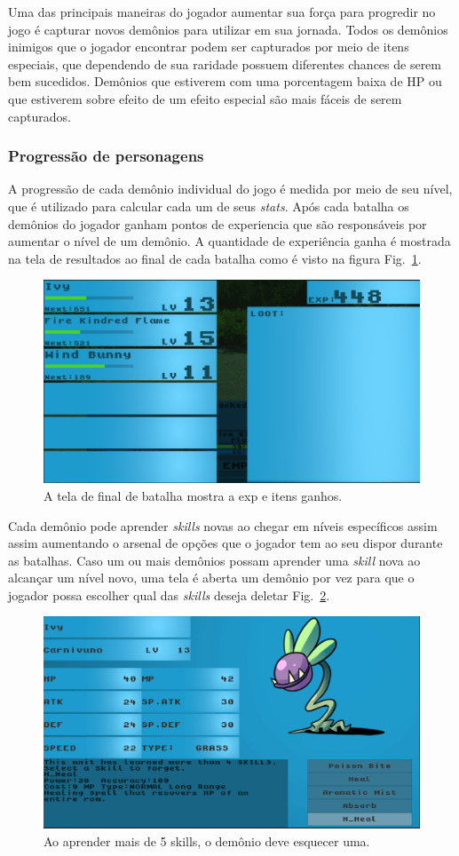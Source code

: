 Uma das principais maneiras do jogador aumentar sua força para progredir no jogo é capturar novos demônios para utilizar em sua jornada. Todos os demônios inimigos que o jogador encontrar podem ser capturados por meio de itens especiais, que dependendo de sua raridade possuem diferentes chances de serem bem sucedidos. Demônios que estiverem com uma porcentagem baixa de HP ou que estiverem sobre efeito de um efeito especial são mais fáceis de serem capturados.

\subsubsection{Progressão de personagens}\label{progression}

	A progressão de cada demônio individual do jogo é medida por meio de seu nível, que é utilizado para calcular cada um de seus \emph{stats}. Após cada batalha os demônios do jogador ganham pontos de experiencia que são responsáveis por aumentar o nível de um demônio. A quantidade de experiência ganha é mostrada na tela de resultados ao final de cada batalha como é visto na figura Fig.~\ref{fig:exp}.
	
\begin{figure}[h!]
 \centering
  \includegraphics[width=0.5\linewidth]{endscreen.jpg}
  \caption{A tela de final de batalha mostra a exp e itens ganhos.}
  \label{fig:exp}
\end{figure}

	Cada demônio pode aprender \emph{skills} novas ao chegar em níveis específicos assim assim aumentando o arsenal de opções que o jogador tem ao seu dispor durante as batalhas. Caso um ou mais demônios possam aprender uma \emph{skill} nova ao alcançar um nível novo, uma tela é aberta um demônio por vez para que o jogador possa escolher qual das \emph{skills} deseja deletar Fig.~\ref{fig:learn}.
	
\begin{figure}[h!]
 \centering
  \includegraphics[width=0.5\linewidth]{learn.jpg}
  \caption{Ao aprender mais de 5 skills, o demônio deve esquecer uma.}
  \label{fig:learn}
\end{figure}

